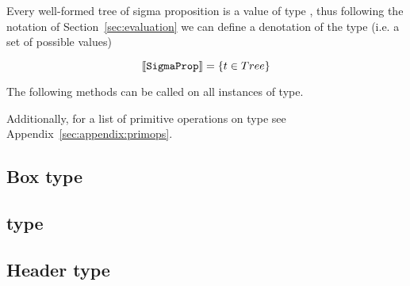 Every well-formed tree of sigma proposition is a value of type
, thus following the notation of Section~\ref{sec:evaluation}
we can define a denotation of the  type (i.e. a set of possible values)

$$\Denot{\lst{SigmaProp}} = \Set{t \in Tree}$$


The following methods can be called on all instances of  type.



Additionally, for a list of primitive operations on  type see
Appendix~\ref{sec:appendix:primops}.

\subsection{Box type}
\label{sec:type:Box}


\subsection{ type}
\label{sec:type:AvlTree}




\subsection{Header type}
\label{sec:type:Header}


